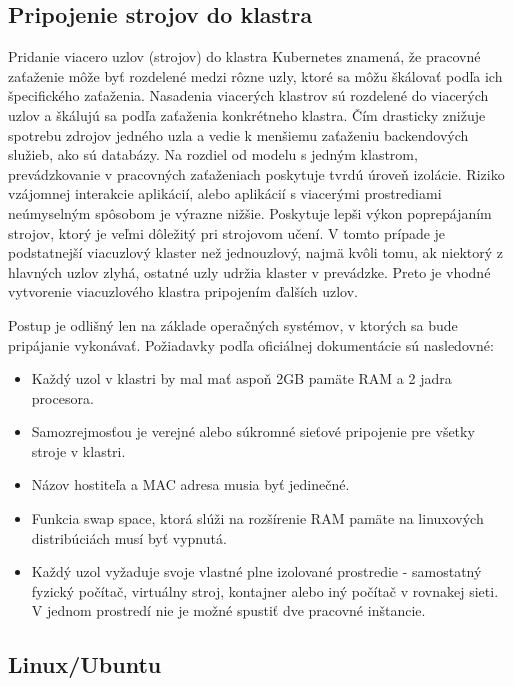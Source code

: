 \subsection{Pripojenie strojov do klastra}

Pridanie viacero uzlov (strojov) do klastra Kubernetes znamená, že pracovné zaťaženie môže byť rozdelené medzi rôzne uzly, ktoré sa môžu škálovať podľa ich špecifického zaťaženia. Nasadenia viacerých klastrov sú rozdelené do viacerých uzlov a škálujú sa podľa zaťaženia konkrétneho klastra. Čím drasticky znižuje spotrebu zdrojov jedného uzla a vedie k menšiemu zaťaženiu backendových služieb, ako sú databázy. Na rozdiel od modelu s jedným klastrom, prevádzkovanie v pracovných zaťaženiach poskytuje tvrdú úroveň izolácie. Riziko vzájomnej interakcie aplikácií, alebo aplikácií s viacerými prostrediami neúmyselným spôsobom je výrazne nižšie. Poskytuje lepši výkon poprepájaním strojov, ktorý je veľmi dôležitý pri strojovom učení. V tomto prípade je podstatnejší viacuzlový klaster než jednouzlový, najmä kvôli tomu, ak niektorý z hlavných uzlov zlyhá, ostatné uzly udržia klaster v prevádzke. Preto je vhodné vytvorenie viacuzlového klastra pripojením ďalších uzlov.

Postup je odlišný len na základe operačných systémov, v ktorých sa bude pripájanie vykonávať. Požiadavky podľa oficiálnej dokumentácie sú nasledovné:

\begin{itemize}
    \item Každý uzol v klastri by mal mať aspoň 2GB pamäte RAM a 2 jadra procesora.
    \item Samozrejmosťou je verejné alebo súkromné sieťové pripojenie pre všetky stroje v klastri.
    \item Názov hostiteľa a MAC adresa musia byť jedinečné.
    \item Funkcia swap space, ktorá slúži na rozšírenie RAM pamäte na linuxových distribúciách musí byť vypnutá.
    \item Každý uzol vyžaduje svoje vlastné plne izolované prostredie - samostatný fyzický počítač, virtuálny stroj, kontajner alebo iný počítač v rovnakej sieti. V jednom prostredí nie je možné spustiť dve pracovné inštancie.
\end{itemize}

\subsection*{Linux/Ubuntu}

